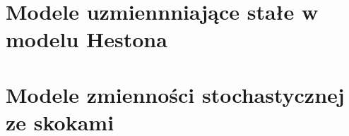 \documentclass{pracamgr}
\begin{document}
\section{Modele uzmiennniające stałe w modelu Hestona} %
\label{sec:modele_uzmiennniajace}


\section{Modele zmienności stochastycznej ze skokami} %
\label{sec:modele_zmienno_ci_stochastycznej_ze_skokami}












\end{document}
